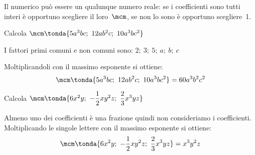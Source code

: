 Il  numerico può essere un qualunque 
numero reale: se i coefficienti sono tutti interi è opportuno scegliere 
il loro~\(\mcm\), se non lo sono è opportuno scegliere~1.

% 
% 
% 
% 
% 
% 
\begin{esempio}{}{}
Calcola \(\mcm \tonda{5a^{3}bc;~12ab^{2}c;~10a^{3}bc^{2}}\)

I fattori primi comuni e non comuni sono: \quad 
\(2;~3;~5;~a;~b;~c\)

Moltiplicandoli con il massimo esponente si ottiene:
\[\mcm \tonda{5a^{3}bc;~12ab^{2}c;~10a^{3}bc^{2}} = 60a^{3}b^{2}c^{2}\]
\end{esempio}

\begin{esempio}{}{}
Calcola 
\(\mcm \tonda{6x^{2}y;~-\dfrac{1}{2}xy^{2}z;~\dfrac{2}{3}x^{3}yz}\)

Almeno uno dei coefficienti è una frazione quindi non consideriamo i 
coefficienti.
Moltiplicando le singole lettere con il massimo esponente si ottiene:
\[\mcm \tonda{6x^{2}y;~-\frac{1}{2}xy^{2}z;~\frac{2}{3}x^{3}yz} = 
x^{3}y^{2}z\]
\end{esempio}

